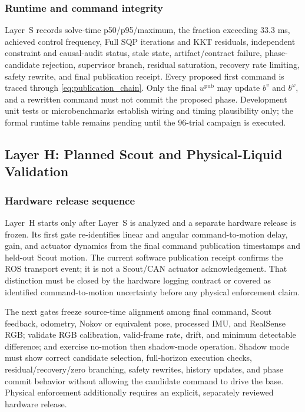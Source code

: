 \subsubsection{Runtime and command integrity}

Layer~S records solve-time p50/p95/maximum, the fraction exceeding 33.3 ms,
achieved control frequency, Full SQP iterations and KKT residuals, independent
constraint and causal-audit status, stale state, artifact/contract failure,
phase-candidate rejection, supervisor branch, residual saturation, recovery
rate limiting, safety rewrite, and final publication receipt.  Every proposed
first command is traced through \eqref{eq:publication_chain}.  Only the final
$u^{\mathrm{pub}}$ may update $b^v$ and $b^\omega$, and a rewritten command
must not commit the proposed phase. Development unit tests or microbenchmarks establish
wiring and timing plausibility only; the formal runtime table remains pending
until the 96-trial campaign is executed.

\subsection{Layer H: Planned Scout and Physical-Liquid Validation}

\subsubsection{Hardware release sequence}

Layer~H starts only after Layer~S is analyzed and a separate hardware release
is frozen.  Its first gate re-identifies linear and angular command-to-motion
delay, gain, and actuator dynamics from the final command publication
timestamps and held-out Scout motion.  The current software publication
receipt confirms the ROS transport event; it is not a Scout/CAN actuator
acknowledgement.  That distinction must be closed by the hardware logging
contract or covered as identified command-to-motion uncertainty before any
physical enforcement claim.

The next gates freeze source-time alignment among final command, Scout
feedback, odometry, Nokov or equivalent pose, processed IMU, and RealSense RGB;
validate RGB calibration, valid-frame rate, drift, and minimum detectable
difference; and exercise no-motion then shadow-mode operation.  Shadow mode
must show correct candidate selection, full-horizon execution checks,
residual/recovery/zero branching, safety rewrites, history updates, and phase
commit behavior without allowing the candidate command to drive the base.
Physical enforcement additionally requires an explicit, separately reviewed
hardware release.

